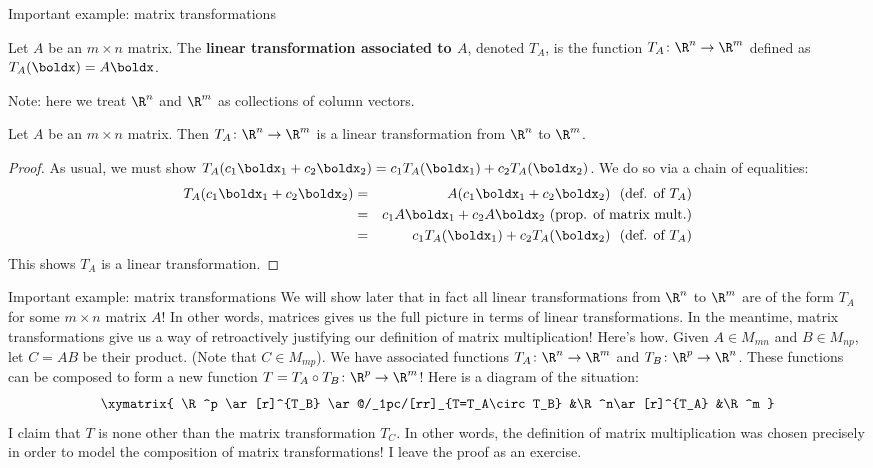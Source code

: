\begin{frame}{Important example: \alert{matrix transformations}}
\begin{definition}
Let $A$ be an $m\times n$ matrix. The {\bf linear transformation associated to $A$}, denoted $T_A$, is the function $T_A\colon\R^n\rightarrow \R^m$ defined as $T_A(\boldx)=A\boldx$. 

Note: here we treat $\R^n$ and $\R^m$ as collections of column vectors. 
\end{definition}
\pause
\begin{theorem}
Let $A$ be an $m\times n$ matrix. Then $T_A\colon \R^n\rightarrow\R^m$ is a linear transformation from $\R^n$ to $\R^m$. 
\end{theorem}
\pause\begin{proof}
As usual, we must show $T_A(c_1\boldx_1+c_2\boldx_2)=c_1T_A(\boldx_1)+c_2T_A(\boldx_2)$. We do so via a chain of equalities: 
\begin{eqnarray*}
T_A(c_1\boldx_1+c_2\boldx_2)&=&A(c_1\boldx_1+c_2\boldx_2) \ \text{ (def. of $T_A$)}\\
&=&c_1A\boldx_1+c_2A\boldx_2 \ \text{(prop. of matrix mult.)}\\
&=&c_1T_A(\boldx_1)+c_2T_A(\boldx_2) \ \text{ (def. of $T_A$)}
\end{eqnarray*}
This shows $T_A$ is a linear transformation. 
\end{proof}
\end{frame}
\begin{frame}{Important example: \alert{matrix transformations}}
We will show later that in fact \alert{all} linear transformations from $\R^n$ to $\R^m$ are of the form $T_A$ for some $m\times n$ matrix $A$!  In other words, matrices gives us the full picture in terms of linear transformations. 
\bpause 
In the meantime, matrix transformations give us a way of \alert{retroactively} justifying our definition of matrix multiplication! Here's how. 
\bpause 
Given $A\in M_{mn}$ and $B\in M_{np}$, let $C=AB$ be their product. (Note that $C\in M_{mp}$). 
\bpause 
We have associated functions $T_A\colon \R^n\rightarrow \R^m$ and $T_B\colon \R^p\rightarrow\R^n$. These functions can be \alert{composed} to form a new function $T=T_A\circ T_B\colon \R^p\rightarrow \R^m$! Here is a diagram of the situation:
\[
\xymatrix{
\R^p \ar[r]^{T_B} \ar@/_1pc/[rr]_{T=T_A\circ T_B} &\R^n\ar[r]^{T_A} &\R^m
}
\]
\pause I claim that $T$ is none other than the matrix transformation $T_C$. In other words, the definition of matrix multiplication was chosen precisely in order to model the composition of matrix transformations! 
\bpause I leave the proof as an exercise. 
\end{frame}
